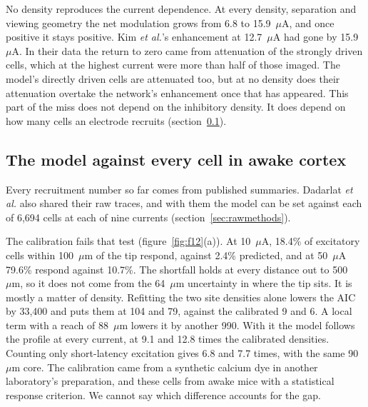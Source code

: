 \documentclass[10pt,twocolumn]{article}
\newcommand{\um}{\ensuremath{\mu\text{m}}}
\newcommand{\uA}{\ensuremath{\mu\text{A}}}
\begin{document}
No density reproduces the current dependence. At every density,
separation and viewing geometry the net modulation grows from 6.8 to
15.9~\uA, and once positive it stays positive. Kim \textit{et al.}'s
enhancement at 12.7~\uA{} had gone by 15.9~\uA. In their data the return
to zero came from attenuation of the strongly driven cells, which at the
highest current were more than half of those imaged. The model's directly
driven cells are attenuated too, but at no density does their attenuation
overtake the network's enhancement once that has appeared. This part of
the miss does not depend on the inhibitory density. It does depend on how
many cells an electrode recruits (section~\ref{sec:awake}).

\begin{table}[t]
\centering
\caption{Direct inhibitory recruitment against the two mouse datasets.
  Inhibitory site density is relative to the calibrated value. The I/E
  ratio is that of recruited cells within 300~\um{} at 20~\uA, published
  as about 1.1 \citep{dadarlat2024} and 1.47 (1.00--1.98) read from the
  raw cells (section~\ref{sec:awake}). Paired net modulation is for electrodes
  485~\um{} apart at 200~Hz, in percent of the summed single responses over
  an 800~\um{} square centred between the electrodes. Kim \textit{et al.}
  report a positive net at 12.7~\uA{} \citep{kim2025}. $^\ast$The same over
  a 500~\um{} square with one electrode at its corner. Signed interaction
  is summed over the sheet.}
\label{tab:inh}
\small

\end{table}

\subsection{The model against every cell in awake cortex}
\label{sec:awake}

Every recruitment number so far comes from published summaries.
Dadarlat \textit{et al.} also shared their raw traces, and with them the
model can be set against each of 6,694 cells at each of nine currents
(section~\ref{sec:rawmethods}).

The calibration fails that test (figure~\ref{fig:f12}(a)). At 10~\uA,
18.4\% of excitatory cells within 100~\um{} of the tip respond, against
2.4\% predicted, and at 50~\uA{} 79.6\% respond against 10.7\%. The
shortfall holds at every distance out to 500~\um, so it does not come
from the 64~\um{} uncertainty in where the tip sits. It is mostly a matter
of density. Refitting the two site densities alone lowers the AIC by
33,400 and puts them at 104 and 79, against the calibrated 9 and 6. A
local term with a reach of 88~\um{} lowers it by another 990. With it the
model follows the profile at every current, at 9.1 and 12.8 times the
calibrated densities. Counting only short-latency excitation gives 6.8
and 7.7 times, with the same 90~\um{} core. The calibration came from a
synthetic calcium dye in another laboratory's preparation, and these
cells from awake mice with a statistical response criterion. We cannot
say which difference accounts for the gap.
\end{document}
